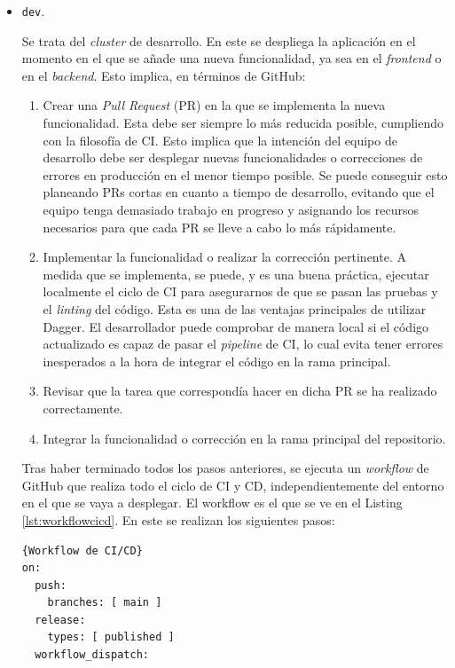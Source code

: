 \begin{itemize}
  \item \texttt{dev}.

    Se trata del \textit{cluster} de desarrollo. En este se despliega la aplicación en el momento en el que se añade una nueva funcionalidad, ya sea en el \textit{frontend} o en el \textit{backend}. Esto implica, en términos de GitHub:

    \begin{enumerate}
      \item Crear una \textit{Pull Request} (PR) en la que se implementa la nueva funcionalidad. Esta debe ser siempre lo más reducida posible, cumpliendo con la filosofía de CI. Esto implica que la intención del equipo de desarrollo debe ser desplegar nuevas funcionalidades o correcciones de errores en producción en el menor tiempo posible. Se puede conseguir esto planeando PRs cortas en cuanto a tiempo de desarrollo, evitando que el equipo tenga demasiado trabajo en progreso y asignando los recursos necesarios para que cada PR se lleve a cabo lo más rápidamente\cite{linear}.
      \item Implementar la funcionalidad o realizar la corrección pertinente. A medida que se implementa, se puede, y es una buena práctica, ejecutar localmente el ciclo de CI para asegurarnos de que se pasan las pruebas y el \textit{linting} del código. Esta es una de las ventajas principales de utilizar Dagger. El desarrollador puede comprobar de manera local si el código actualizado es capaz de pasar el \textit{pipeline} de CI, lo cual evita tener errores inesperados a la hora de integrar el código en la rama principal.
      \item Revisar que la tarea que correspondía hacer en dicha PR se ha realizado correctamente.
      \item Integrar la funcionalidad o corrección en la rama principal del repositorio.
    \end{enumerate}

    Tras haber terminado todos los pasos anteriores, se ejecuta un \textit{workflow} de GitHub que realiza todo el ciclo de CI y CD, independientemente del entorno en el que se vaya a desplegar. El workflow es el que se ve en el Listing \ref{lst:workflowcicd}. En este se realizan los siguientes pasos:

\begin{lstlisting}[language=workflows,label=lst:workflowcicd]{Workflow de CI/CD}
on:
  push:
    branches: [ main ]
  release:
    types: [ published ]
  workflow_dispatch:


\end{lstlisting}
\end{itemize}
